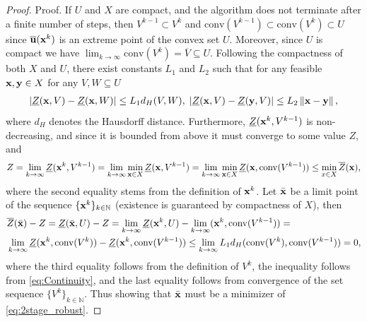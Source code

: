 \documentclass[12pt,x11names]{article}
\theoremstyle{definition}
\newcommand{\norm}[1]{\left\Vert {#1} \right\Vert} %
\newcommand{\conv}{\mathrm{conv}} %
\newcommand{\bu}{{\bf u}}
\newcommand{\bx}{{\bf x}}
\newcommand{\by}{{\bf y}}
\DeclareMathOperator*{\argmin}{arg\,min}
\begin{document}
\begin{appendix}
\begin{proof}{Proof.}
If $U$ and $X$ are compact, and the algorithm does not terminate after a finite number of steps, then $V^{k-1}\subset V^k$ and  $\conv(V^{k-1})\subset \conv(V^k)\subset U$ since $\overline{\bu}(\bx^k)$ is an extreme point of the convex set $U$. Moreover, since $U$ is compact we have $\lim_{k\rightarrow\infty}\conv(V^k)=\overline{V}\subseteq U$. Following the compactness of both $X$ and $U$, there exist constants $L_1$ and $L_2$ such that for any feasible $\bx,\by\in X$ for any $V,W\subseteq U$ 
\begin{align}
|\underline{Z}(\bx,V)-\underline{Z}(\bx,W)|\leq L_1d_H(V,W),\; |\underline{Z}(\bx,V)-\underline{Z}(\by,V)|\leq L_2\norm{\bx-\by},\label{eq:Continuity}
\end{align}
where $d_H$ denotes the Hausdorff distance.
Furthermore, 
$\underline{Z}(\bx^k,V^{k-1})$ is non-decreasing, and since it is bounded from above it must converge to some value $Z$, and
$$Z=\lim_{k\rightarrow\infty}\underline{Z}(\bx^k,V^{k-1})=\lim_{k\rightarrow\infty}\min_{\bx\in X} \underline{Z}(\bx,V^{k-1})=\lim_{k\rightarrow\infty}\min_{\bx\in X} \underline{Z}(\bx,\conv(V^{k-1}))\leq \min_{x\in X} \overline{Z}(\bx),$$
where the second equality stems from the definition of $\bx^k$. Let $\bar{\bx}$ be a limit point of the sequence $\{\bx^k\}_{k\in\mathbb{N}}$ (existence is guaranteed by compactness of $X$),
then 
\begin{align*}
&\overline{Z}(\bar{\bx})-Z=\underline{Z}(\bar{\bx},U) -Z=\lim_{k\rightarrow\infty} \underline{Z}(\bx^{k},U) -  \lim_{k\rightarrow\infty}(\bx^k,\conv(V^{k-1}))=\\
&\lim_{k\rightarrow\infty} \underline{Z}(\bx^{k},\conv(V^{k}))-\underline{Z}(\bx^{k},\conv(V^{k-1}))\leq \lim_{k\rightarrow\infty} L_1 d_H(\conv(V^{k}),\conv(V^{k-1})) =0,
\end{align*}
where the third equality follows from the definition of $V^k$, the inequality follows from \eqref{eq:Continuity}, and the last equality follows from convergence of the set sequence $\{V^k\}_{k\in\mathbb{N}}$. 
Thus showing that $\bar{\bx}$ must be a minimizer of \eqref{eq:2stage_robust}.
\end{proof}


\end{appendix}
\end{document}

